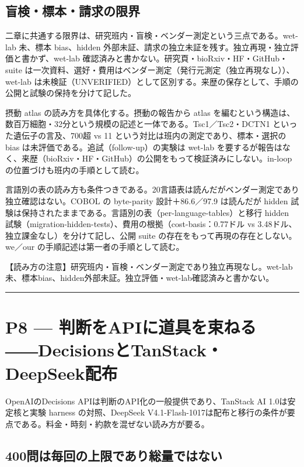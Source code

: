 \documentclass[lualatex,a4paper,10pt]{jlreq}
\begin{document}
\subsection*{盲検・標本・請求の限界}


二章に共通する限界は、研究班内・盲検・ベンダー測定という三点である。wet-lab 未、標本 bias、hidden 外部未証、請求の独立未証を残す。独立再現・独立評価と書かず、wet-lab 確認済みと書かない。研究頁・bioRxiv・HF・GitHub・suite は一次資料、選好・費用はベンダー測定（発行元測定（独立再現なし））、wet-lab は未検証（UNVERIFIED）として区別する。来歴の保存として、手順の公開と試験の保持を分けて記した。


摂動 atlas の読み方を具体化する。摂動の報告から atlas を編むという構造は、数百万細胞・32分という規模の記述と一体である。Tsc1／Tsc2・DCTN1 といった遺伝子の言及、700超 vs 11 という対比は班内の測定であり、標本・選択の bias は未評価である。追試（follow-up）の実験は wet-lab を要するが報告はなく、来歴（bioRxiv・HF・GitHub）の公開をもって検証済みにしない。in-loop の位置づけも班内の手順として読む。


言語別の表の読み方も条件つきである。20言語表は読んだがベンダー測定であり独立確認はない。COBOL の byte-parity 設計＋86.6／97.9 は読んだが hidden 試験は保持されたままである。言語別の表（per-language-tables）と移行 hidden 試験（migration-hidden-tests）、費用の根拠（cost-basis：0.77ドル vs 3.48ドル、独立課金なし）を分けて記し、公開 suite の存在をもって再現の存在としない。we／our の手順記述は第一者の手順として読む。


\begin{tcolorbox}[colback=SurveySoft,colframe=SurveyRule,arc=1mm,boxrule=0.4pt,left=2mm,right=2mm]
【読み方の注意】研究班内・盲検・ベンダー測定であり独立再現なし。wet-lab未、標本bias、hidden外部未証。独立評価・wet-lab確認済みと書かない。

\end{tcolorbox}


\bigskip\hrule\bigskip


\section{P8 --- 判断をAPIに道具を束ねる――DecisionsとTanStack・DeepSeek配布}
\label{sec:P8}


OpenAIのDecisions APIは判断のAPI化の一般提供であり、TanStack AI 1.0は安定核と実験 harness の対照、DeepSeek V4.1-Flash-1017は配布と移行の条件が要点である。料金・時刻・約款を混ぜない読み方が要る。


\subsection*{400問は毎回の上限であり総量ではない}
\end{document}

